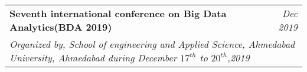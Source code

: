 \documentclass[letterpaper,11pt]{article}
\makeatletter
\newcommand{\resumeOrganizationHeading}[4]{
  \vspace{-2pt}\item
    \begin{tabular*}{0.97\textwidth}[t]{l@{\extracolsep{\fill}}r}
      \textbf{#1} & \textit{\small #2} \\
      \multicolumn{2}{p{0.97\textwidth}}{\raggedright\textit{\small #3}}\\[-5pt]

    \end{tabular*}\vspace{-7pt}
}
\newcommand{\resumeSubHeadingListStart}{\begin{itemize}[leftmargin=0.15in, label={}]}
\newcommand{\resumeSubHeadingListEnd}{\end{itemize}}
\makeatother
\begin{document}
    \resumeOrganizationHeading
      {Seventh international conference on Big Data Analytics(BDA 2019) \href{https://firebasestorage.googleapis.com/v0/b/documents-64531.appspot.com/o/bda_conf.pdf?alt=media}{\raisebox{-0.1\height}\faExternalLink }}{Dec 2019}{Organized by, School of engineering and Applied Science, Ahmedabad University, Ahmedabad during December $17^{th}$ to $20^{th}$,2019}     
        
  \resumeSubHeadingListEnd




    
    








    



\end{document}

